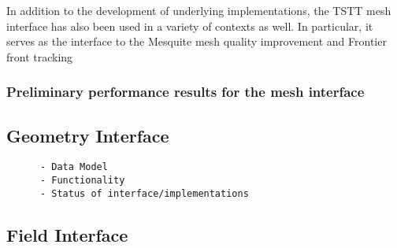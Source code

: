 In addition to the development of underlying implementations, the
TSTT mesh interface has also been used in a variety of contexts as
well.  In particular, it serves as the interface to the Mesquite 
mesh quality improvement and Frontier front tracking


\subsubsection{Preliminary performance results for the mesh interface}

\subsection{Geometry Interface}
\begin{verbatim}
      - Data Model
      - Functionality
      - Status of interface/implementations
\end{verbatim}

\subsection{Field Interface}
